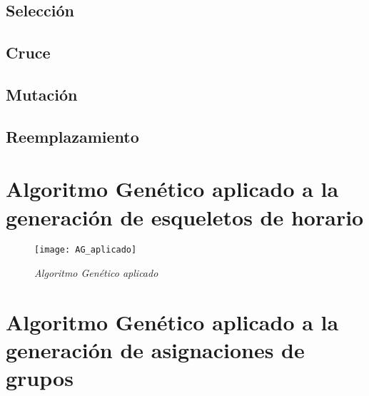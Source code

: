 \subsection{Selección}

\subsection{Cruce}

\subsection{Mutación}

\subsection{Reemplazamiento}

\section{Algoritmo Genético aplicado a la generación de esqueletos de horario}

\begin{figure}[H]
\centering
\texttt{[image: AG\_aplicado]} %
\caption{\textit{Algoritmo Genético aplicado}}
\end{figure}


\section{Algoritmo Genético aplicado a la generación de asignaciones de grupos}
